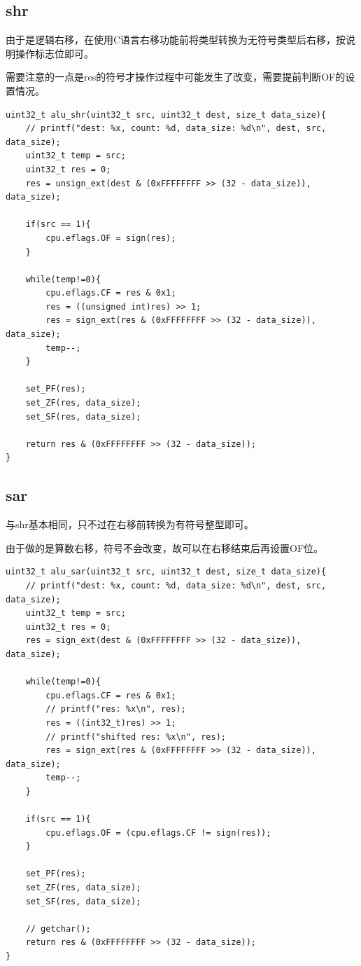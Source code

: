 \documentclass[UTF8]{ctexart}
\begin{document}
\subsection{shr}
由于是逻辑右移，在使用C语言右移功能前将类型转换为无符号类型后右移，按说明操作标志位即可。
\par 需要注意的一点是res的符号才操作过程中可能发生了改变，需要提前判断OF的设置情况。
\begin{lstlisting}[style=CStyle]
uint32_t alu_shr(uint32_t src, uint32_t dest, size_t data_size){
    // printf("dest: %x, count: %d, data_size: %d\n", dest, src, data_size);
    uint32_t temp = src;
    uint32_t res = 0;
    res = unsign_ext(dest & (0xFFFFFFFF >> (32 - data_size)), data_size);
    
    if(src == 1){
        cpu.eflags.OF = sign(res);
    }
    
    while(temp!=0){
        cpu.eflags.CF = res & 0x1;
        res = ((unsigned int)res) >> 1;
        res = sign_ext(res & (0xFFFFFFFF >> (32 - data_size)), data_size);
        temp--;
    }
    
    set_PF(res);
    set_ZF(res, data_size);
    set_SF(res, data_size);
    
    return res & (0xFFFFFFFF >> (32 - data_size));
}
\end{lstlisting}

\subsection{sar}
与shr基本相同，只不过在右移前转换为有符号整型即可。
\par 由于做的是算数右移，符号不会改变，故可以在右移结束后再设置OF位。

\begin{lstlisting}[style=CStyle]
uint32_t alu_sar(uint32_t src, uint32_t dest, size_t data_size){
    // printf("dest: %x, count: %d, data_size: %d\n", dest, src, data_size);
    uint32_t temp = src;
    uint32_t res = 0;
    res = sign_ext(dest & (0xFFFFFFFF >> (32 - data_size)), data_size);
    
    while(temp!=0){
        cpu.eflags.CF = res & 0x1;
        // printf("res: %x\n", res);
        res = ((int32_t)res) >> 1;
        // printf("shifted res: %x\n", res);
        res = sign_ext(res & (0xFFFFFFFF >> (32 - data_size)), data_size);
        temp--;
    }
    
    if(src == 1){
        cpu.eflags.OF = (cpu.eflags.CF != sign(res));
    }
    
    set_PF(res);
    set_ZF(res, data_size);
    set_SF(res, data_size);
    
    // getchar();
    return res & (0xFFFFFFFF >> (32 - data_size));
}
\end{lstlisting}
\end{document}
